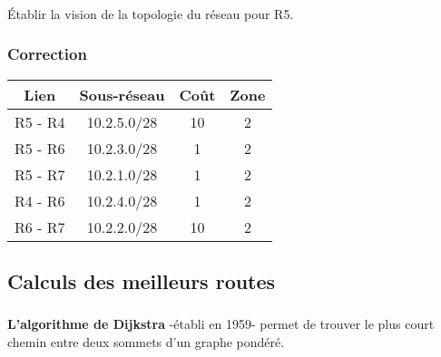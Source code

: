 \documentclass[svgnames,11pt]{beamer}
\begin{document}
\begin{frame}
    \frametitle{}

    \begin{activite}
        Établir la vision de la topologie du réseau pour R5.
    \end{activite}

\end{frame}

\begin{frame}
    \frametitle{Correction}

    \begin{center}
        \begin{tabular}{|*{4}{c|}}
            \hline
            Lien    & Sous-réseau & Coût & Zone \\
            \hline
            R5 - R4 & 10.2.5.0/28 & 10   & 2    \\
            \hline
            R5 - R6 & 10.2.3.0/28 & 1    & 2    \\
            \hline
            R5 - R7 & 10.2.1.0/28 & 1    & 2    \\
            \hline
            R4 - R6 & 10.2.4.0/28 & 1    & 2    \\
            \hline
            R6 - R7 & 10.2.2.0/28 & 10    & 2    \\
            \hline
        \end{tabular}
    \end{center}

\end{frame}

\subsection{Calculs des meilleurs routes}

\begin{frame}
    \frametitle{}

    \begin{aretenir}[]
        \textbf{L'algorithme de Dijkstra} -établi en 1959- permet de trouver le plus court chemin entre deux sommets d'un graphe pondéré.
    \end{aretenir}
\end{frame}
\end{document}
